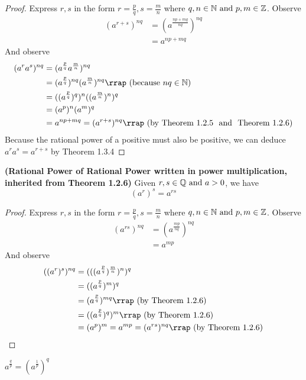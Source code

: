\documentclass{report}
\begin{document}
\begin{proof}
Express $r,s$ in the form $r=\frac{p}{q},s=\frac{m}{n}$ where $q,n\in\mathbb{N}\text{ and }p,m \in\mathbb{Z}$. Observe
\begin{align}
  (a^{r+s})^{nq}&=(a^{\frac{np+mq}{nq}})^{nq}\\
  &=a^{np+mq} 
\end{align}
And observe
\begin{align}
  (a^ra^s)^{nq}&= (a^{\frac{p}{q}}a^{\frac{m}{n}})^{nq} \\
  &= (a^{\frac{p}{q}})^{nq}(a^{\frac{m}{n}})^{nq}\rap{because $nq\inn$}\\
  &=((a^{\frac{p}{q}})^q)^n((a^{\frac{m}{n}})^n)^q\\
&=(a^p)^n(a^m)^q\\
&= a^{np+mq}=(a^{r+s})^{nq}\rap{by Theorem 1.2.5 \text{ and } Theorem 1.2.6} 
\end{align}
Because the rational power of a positive must also be positive, we can deduce $a^ra^s=a^{r+s}$ by Theorem 1.3.4
\end{proof}
\begin{theorem}

\textbf{(Rational Power of Rational Power written in power multiplication, inherited from Theorem 1.2.6)} Given $r,s\in\mathbb{Q}\text{ and }a>0$, we have
\begin{equation}
  (a^r)^s=a^{rs}
\end{equation}
\end{theorem}
\begin{proof}
Express $r,s$ in the form $r=\frac{p}{q},s=\frac{m}{n}$ where $q,n\in\mathbb{N}\text{ and }p,m \in\mathbb{Z}$. Observe
\begin{align}
  (a^{rs})^{nq}&=(a^{\frac{mp}{nq}})^{nq}\\
  &= a^{mp}
\end{align}
And observe
\begin{align}
  ((a^r)^s)^{nq}&=(((a^{\frac{p}{q}})^{\frac{m}{n}})^n)^q\\
  &=((a^{\frac{p}{q}})^m)^q\\
  &=(a^{\frac{p}{q}})^{mq}\rap{by Theorem 1.2.6}\\
  &=((a^{\frac{p}{q}})^q)^m \rap{by Theorem 1.2.6}\\
  &=(a^p)^m=a^{mp}=(a^{rs})^{nq} \rap{by Theorem 1.2.6} 
\end{align}
\end{proof}
\begin{corollary}
$a^{\frac{q}{p}}=(a^{\frac{1}{p}})^q$
\end{corollary}
\end{document}
